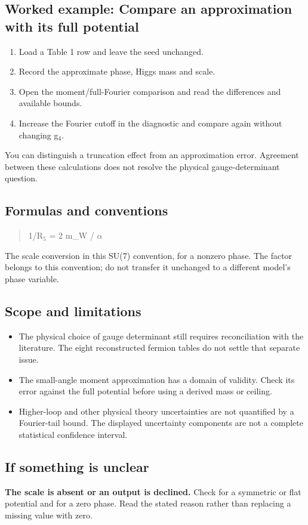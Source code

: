 \documentclass[11pt,a4paper]{article}
\begin{document}
\subsection*{Worked example: Compare an approximation with its full potential}
\begin{enumerate}
\item Load a Table 1 row and leave the seed unchanged.
\item Record the approximate phase, Higgs mass and scale.
\item Open the moment/full-Fourier comparison and read the differences and available bounds.
\item Increase the Fourier cutoff in the diagnostic and compare again without changing g\ensuremath{{}_{4}}.
\end{enumerate}
You can distinguish a truncation effect from an approximation error. Agreement between these calculations does not resolve the physical gauge-determinant question.
\subsection*{Formulas and conventions}
\begin{quote}1/R\ensuremath{{}_{5}} = 2 m\_W / \ensuremath{\alpha}\end{quote}
The scale conversion in this SU(7) convention, for a nonzero phase. The factor belongs to this convention; do not transfer it unchanged to a different model's phase variable.

\subsection*{Scope and limitations}
\begin{itemize}
\item The physical choice of gauge determinant still requires reconciliation with the literature. The eight reconstructed fermion tables do not settle that separate issue.
\item The small-angle moment approximation has a domain of validity. Check its error against the full potential before using a derived mass or ceiling.
\item Higher-loop and other physical theory uncertainties are not quantified by a Fourier-tail bound. The displayed uncertainty components are not a complete statistical confidence interval.
\end{itemize}
\subsection*{If something is unclear}
\textbf{The scale is absent or an output is declined.} Check for a symmetric or flat potential and for a zero phase. Read the stated reason rather than replacing a missing value with zero.
\end{document}
